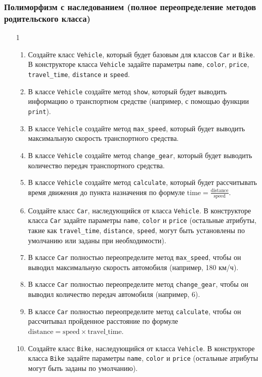 \subsubsection{Полиморфизм с наследованием (полное переопределение методов родительского класса)}
\begin{enumerate}
\item[1]
\begin{enumerate}
    \item Создайте класс \texttt{Vehicle}, который будет базовым для классов \texttt{Car} и \texttt{Bike}. В конструкторе класса \texttt{Vehicle} задайте параметры \texttt{name}, \texttt{color}, \texttt{price}, \texttt{travel\_time}, \texttt{distance} и \texttt{speed}.
    \item В классе \texttt{Vehicle} создайте метод \texttt{show}, который будет выводить информацию о транспортном средстве (например, с помощью функции \texttt{print}).
    \item В классе \texttt{Vehicle} создайте метод \texttt{max\_speed}, который будет выводить максимальную скорость транспортного средства.
    \item В классе \texttt{Vehicle} создайте метод \texttt{change\_gear}, который будет выводить количество передач транспортного средства.
    \item В классе \texttt{Vehicle} создайте метод \texttt{calculate}, который будет рассчитывать время движения до пункта назначения по формуле \( \text{time} = \frac{\text{distance}}{\text{speed}} \).
    \item Создайте класс \texttt{Car}, наследующийся от класса \texttt{Vehicle}. В конструкторе класса \texttt{Car} задайте параметры \texttt{name}, \texttt{color} и \texttt{price} (остальные атрибуты, такие как \texttt{travel\_time}, \texttt{distance}, \texttt{speed}, могут быть установлены по умолчанию или заданы при необходимости).
    \item В классе \texttt{Car} полностью переопределите метод \texttt{max\_speed}, чтобы он выводил максимальную скорость автомобиля (например, 180 км/ч).
    \item В классе \texttt{Car} полностью переопределите метод \texttt{change\_gear}, чтобы он выводил количество передач автомобиля (например, 6).
    \item В классе \texttt{Car} полностью переопределите метод \texttt{calculate}, чтобы он рассчитывал пройденное расстояние по формуле \( \text{distance} = \text{speed} \times \text{travel\_time} \).
    \item Создайте класс \texttt{Bike}, наследующийся от класса \texttt{Vehicle}. В конструкторе класса \texttt{Bike} задайте параметры \texttt{name}, \texttt{color} и \texttt{price} (остальные атрибуты могут быть заданы по умолчанию).

\end{enumerate}
\end{enumerate}
